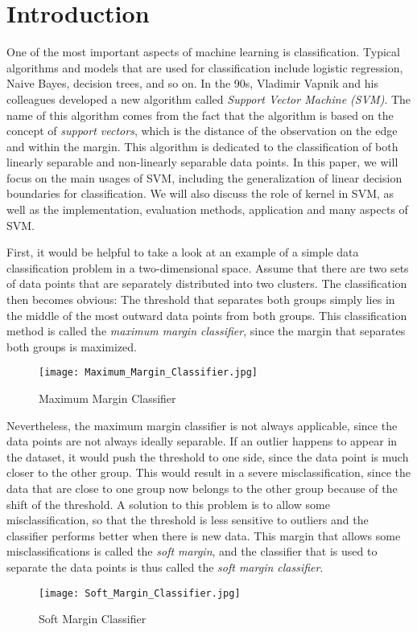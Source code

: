 
\section{Introduction}
One of the most important aspects of machine learning is classification. Typical algorithms and models
that are used for classification include logistic regression, Naive Bayes, decision trees, and so on. In the 90s, 
Vladimir Vapnik and his colleagues developed a new algorithm called \emph{Support Vector Machine (SVM)}.
The name of this algorithm comes from the fact that the algorithm is based on the concept of \emph{support vectors},
which is the distance of the observation on the edge and within the margin. This algorithm is dedicated to the classification
of both linearly separable and non-linearly separable data points. In this paper,
we will focus on the main usages of SVM, including the generalization of linear decision boundaries for classification.
We will also discuss the role of kernel in SVM, as well as the implementation, evaluation methods, application and many aspects of SVM.


First, it would be helpful to take a look at an example of a simple data classification problem in a two-dimensional space.
Assume that there are two sets of data points that are separately distributed into two clusters. The classification then
becomes obvious: The threshold that separates both groups simply lies in the middle of the most outward data points
from both groups. This classification method is called the \emph{maximum margin classifier}, since the margin that separates both groups is maximized.

\begin{figure}[h]%
    \begin{center}%
        \texttt{[image: Maximum\_Margin\_Classifier.jpg]}%
        \caption{Maximum Margin Classifier \cite{imgintro}}\label{fig:}%
    \end{center}%
\end{figure}
Nevertheless, the maximum margin classifier is not always applicable, since the data points are not always ideally separable. If an outlier happens to appear in the dataset, it would push the threshold to one side, since the data point
is much closer to the other group. This would result in a severe misclassification, since the data that are close to one
group now belongs to the other group because of the shift of the threshold. A solution to this problem is to allow some
misclassification, so that the threshold is less sensitive to outliers and the classifier performs better
when there is new data. This margin that allows some misclassifications is called the \emph{soft margin}, and
the classifier that is used to separate the data points is thus called the \emph{soft margin classifier}.
\begin{figure}[h]%
    \begin{center}%
        \texttt{[image: Soft\_Margin\_Classifier.jpg]}%
        \caption{Soft Margin Classifier \cite{imgintro}}\label{fig:}%
    \end{center}%
\end{figure}

